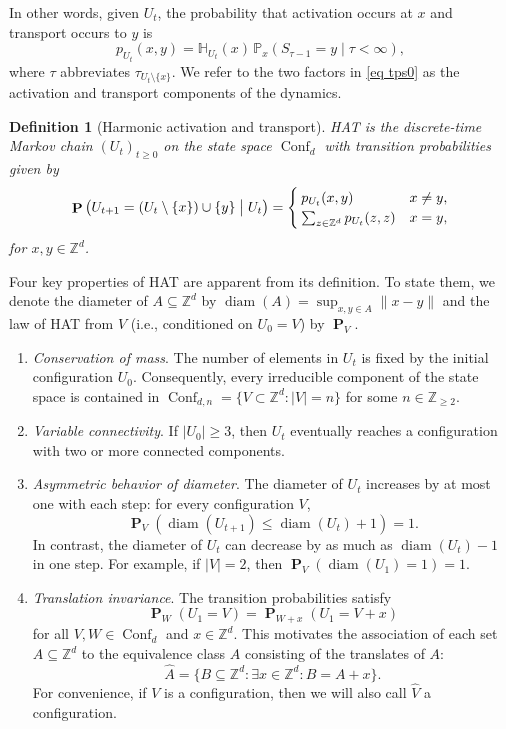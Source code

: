 \documentclass[11pt,reqno]{amsart}
\newtheorem{definition}[lemma]{Definition}
\theoremstyle{definition}
\numberwithin{equation}{section}
\newcommand{\Z}{\mathbb{Z}}
\renewcommand{\P}{\mathbb{P}}
\newcommand{\1}{\mathbf{1}}
\renewcommand{\H}{\mathbb{H}}
\DeclareMathOperator{\PP}{\mathbf{P}}
\DeclareMathOperator{\diam}{diam}
\newcommand{\wt}{\widehat}
\DeclareMathOperator{\Conf}{\mathrm{Conf}}
\begin{document}
In other words, given $U_t$, the probability that activation occurs at $x$ and transport occurs to $y$ is
\begin{equation}\label{eq tps0}
p_{U_t} (x,y) = \H_{U_t} (x) \, \P_x ( S_{\tau - 1} = y \mid \tau < \infty ),
\end{equation}
where $\tau$ abbreviates $\tau_{U_t {\setminus} \{x\}}$. 
We refer to the two factors in \eqref{eq tps0} as the activation and transport components of the dynamics.

\begin{definition}[Harmonic activation and transport] HAT is the discrete-time Markov chain $(U_t)_{t \geq 0}$ on the state space $\Conf_d$ with transition probabilities given by
\begin{equation}\label{eq tps}
\PP \left( U_{t+1} = (U_t \setminus \{x\}) \cup \{y\} \bigm\vert U_t \right) = 
\begin{cases}
p_{U_t} (x,y) & x \neq y,\\ 
\sum_{z \in \Z^d} p_{U_t} (z,z) & x = y,
\end{cases}
\end{equation}
for $x, y \in \Z^d$.
\end{definition}

Four key properties of HAT are apparent from its definition. To state them, we denote the diameter of $A \subseteq \Z^d$ by $\diam (A) = \sup_{x,y \in A} \|x-y\|$ and the law of HAT from $V$ (i.e., conditioned on $U_0 = V$) by $\PP_V$.
\begin{enumerate}
\item {\em Conservation of mass}. The number of elements in $U_t$ is fixed by the initial configuration $U_0$. Consequently, every irreducible component of the state space is contained in $\Conf_{d,n} = \{V \subset \Z^d: |V| = n\}$ for some $n \in \Z_{\geq 2}$.
\item {\em Variable connectivity}. If $|U_0| \geq 3$, then $U_t$ eventually reaches a configuration with two or more connected components.
\item {\em Asymmetric behavior of diameter}. The diameter of $U_t$ increases by at most one with each step: for every configuration $V$,
\begin{equation}\label{amlg0}
\PP_V (\diam (U_{t+1}) \leq \diam (U_t) + 1) = 1.
\end{equation}
In contrast, the diameter of $U_t$ can decrease by as much as $\diam (U_t) - 1$ in one step. For example, if $|V| = 2$, then $\PP_V (\diam (U_1) = 1) = 1$.
\item {\em Translation invariance}. The transition probabilities satisfy
\[
\PP_{W} (U_1 = V) = \PP_{W+x} (U_1 = V+x)
\] 
for all $V, W \in \Conf_d$ and $x \in \Z^d$. This motivates the association of each set $A \subseteq \Z^d$ to the equivalence class $\wt A$ consisting of the translates of $A$:
\[ \wt A = \big\{ B \subseteq \Z^d: \exists x \in \Z^d: B = A + x \big\}.\]
For convenience, if $V$ is a configuration, then we will also call $\wt V$ a configuration.
\end{enumerate}
\end{document}
